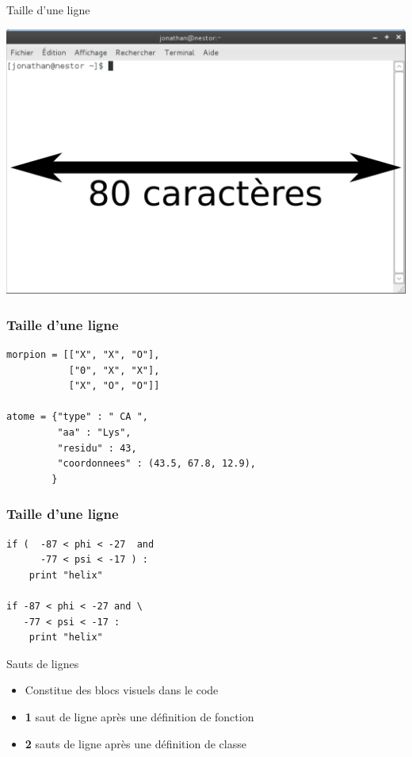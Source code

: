 \documentclass[xcolor=pdftex,dvipsnames,table,handout]{beamer}
\begin{document}
\begin{frame}{Taille d'une ligne}
\begin{center}
\includegraphics[width=0.7\linewidth]{img/Capture-Terminal.pdf}
\end{center}
\end{frame}

\begin{frame}[fragile]
\frametitle{Taille d'une ligne}
\begin{lstlisting}
morpion = [["X", "X", "O"],
           ["0", "X", "X"],
           ["X", "O", "O"]]

atome = {"type" : " CA ",
         "aa" : "Lys",
         "residu" : 43,
         "coordonnees" : (43.5, 67.8, 12.9),
        }
\end{lstlisting}
\end{frame}


\begin{frame}[fragile]
\frametitle{Taille d'une ligne}
\begin{lstlisting}
if (  -87 < phi < -27  and 
      -77 < psi < -17 ) :
    print "helix"

if -87 < phi < -27 and \
   -77 < psi < -17 :
    print "helix"
\end{lstlisting}
\end{frame}

\begin{frame}{Sauts de lignes}
\begin{itemize}
    \item Constitue des blocs visuels dans le code
    \item \textbf{1} saut de ligne après une définition de fonction
    \item \textbf{2} sauts de ligne après une définition de classe
\end{itemize}
\end{frame}
\end{document}
